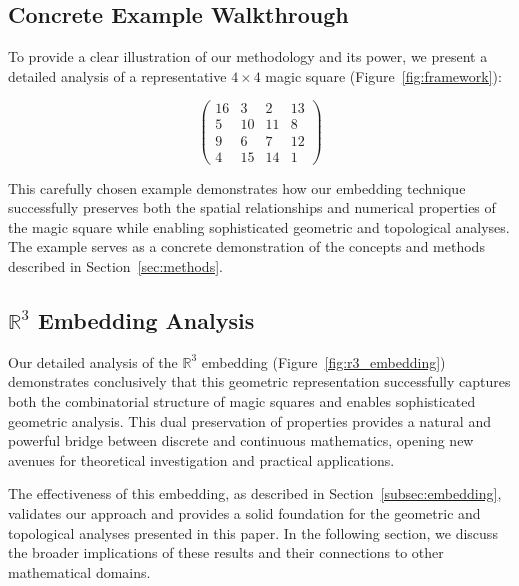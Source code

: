 \subsection{Concrete Example Walkthrough}
\label{subsec:example}

To provide a clear illustration of our methodology and its power, we present a detailed analysis of a representative $4 \times 4$ magic square (Figure~\ref{fig:framework}):

\[
\begin{pmatrix}
16 & 3 & 2 & 13 \\
5 & 10 & 11 & 8 \\
9 & 6 & 7 & 12 \\
4 & 15 & 14 & 1
\end{pmatrix}
\]

This carefully chosen example demonstrates how our embedding technique successfully preserves both the spatial relationships and numerical properties of the magic square while enabling sophisticated geometric and topological analyses. The example serves as a concrete demonstration of the concepts and methods described in Section~\ref{sec:methods}.

\subsection{$\mathbb{R}^3$ Embedding Analysis}
\label{subsec:r3_embedding}

Our detailed analysis of the $\mathbb{R}^3$ embedding (Figure~\ref{fig:r3_embedding}) demonstrates conclusively that this geometric representation successfully captures both the combinatorial structure of magic squares and enables sophisticated geometric analysis. This dual preservation of properties provides a natural and powerful bridge between discrete and continuous mathematics, opening new avenues for theoretical investigation and practical applications.

The effectiveness of this embedding, as described in Section~\ref{subsec:embedding}, validates our approach and provides a solid foundation for the geometric and topological analyses presented in this paper. In the following section, we discuss the broader implications of these results and their connections to other mathematical domains. 